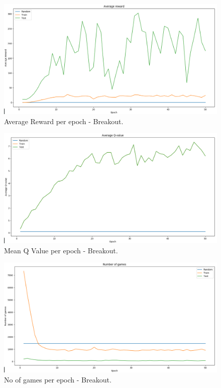 \documentclass[a4paper,11pt]{report}
\begin{document}
			\begin{figure}[H]
				\begin{centering}
					\includegraphics[width=15cm]{images/breakout_1_average_reward.png}
					\caption{Average Reward per epoch - Breakout.}
				\end{centering}
			\end{figure}			
			
			\begin{figure}[H]
				\begin{centering}
					\includegraphics[width=15cm]{images/breakout_2_meanq.png}
					\caption{Mean Q Value per epoch - Breakout.}
				\end{centering}
			\end{figure}			
			
			\begin{figure}[H]
				\begin{centering}
					\includegraphics[width=15cm]{images/breakout_3_nrgames.png}
					\caption{No of games per epoch - Breakout.}
				\end{centering}
			\end{figure}			
			
\end{document}
